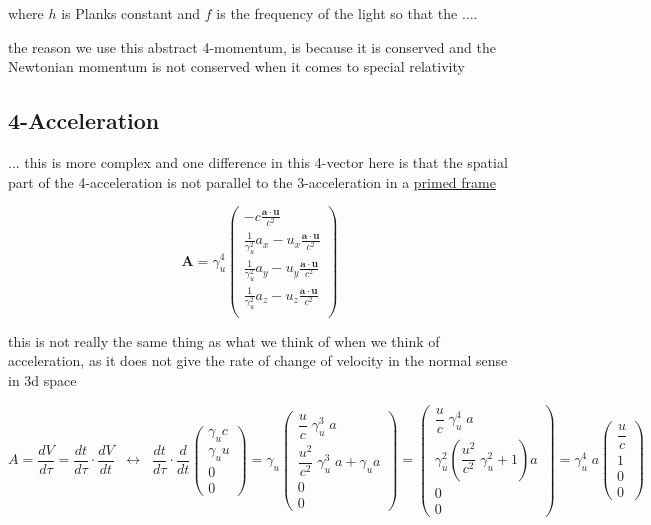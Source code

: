 where $h$ is Planks constant and $f$ is the frequency of the light
so that the
....

the reason we use this abstract 4-momentum, is because it is conserved and the Newtonian momentum is not conserved when it comes to special relativity

\subsection{4-Acceleration}

... this is more complex and one difference in this 4-vector here is that the spatial part of the 4-acceleration is not parallel to the 3-acceleration in a \hyperlink{def-Primed-Frame}{primed frame}

\begin{equation}
	\mathbf{A} = \gamma_u^4
	\begin{pmatrix}
		-c\frac{\mathbf{a}\cdot\mathbf{u}}{c^2}                              \\
		\frac{1}{\gamma_u^2} a_x - u_x \frac{\mathbf{a}\cdot\mathbf{u}}{c^2} \\
		\frac{1}{\gamma_u^2} a_y - u_y \frac{\mathbf{a}\cdot\mathbf{u}}{c^2} \\
		\frac{1}{\gamma_u^2} a_z - u_z \frac{\mathbf{a}\cdot\mathbf{u}}{c^2} \\
	\end{pmatrix}
\end{equation}

this is not really the same thing as what we think of when we think of acceleration, as it does not give the rate of change of velocity in the normal sense in 3d space

\begin{equation}
	A=\dfrac{dV}{d\tau}=
	\dfrac{dt}{d\tau}\cdot\dfrac{dV}{dt} \;\;\leftrightarrow\;\; \dfrac{dt}{d\tau}\cdot \dfrac{d}{dt}
	\left(\begin{array}{*{20}{c}} \gamma_u c \\ \gamma_u u \\ 0 \\ 0 \end{array}\right)
	= \gamma_u
	\left(\begin{array}{*{20}{c}} \dfrac{u}{c}\;\gamma_u^3\;a \\ \dfrac{u^2}{c^2}\;\gamma_u^3\;a+\gamma_u a \\ 0 \\ 0 \end{array}\right)
	=
	\left(\begin{array}{*{20}{c}} \dfrac{u}{c}\;\gamma_u^4\;a \\ \gamma_u^2\left(\dfrac{u^2}{c^2}\;\gamma_u^2+1\right)a \\ 0 \\ 0 \end{array}\right)
	= \gamma_u^4\;a
	\left(\begin{array}{*{20}{c}} \dfrac{u}{c} \\ 1 \\ 0 \\ 0 \end{array}\right)
\end{equation}

